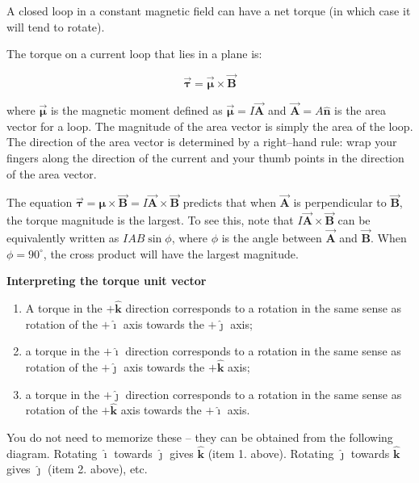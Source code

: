 \documentclass{article}
\newcommand{\ihat}[0]{\hat{\boldsymbol{\imath}}}
\newcommand{\jhat}[0]{\hat{\boldsymbol{\jmath}}}
\newcommand{\khat}[0]{\hat{\boldsymbol{k}}}
\newcommand{\bfvec}[1]{\vec{\mathbf{#1}}}
\begin{document}
A closed loop in a constant magnetic field can have a net torque (in which case it will tend to rotate).

The torque on a current loop that lies in a plane is:

\begin{equation}
\vec{\boldsymbol{\tau}} = \vec{\boldsymbol{\mu}}\times\bfvec{B}
\end{equation}

where $\vec{\boldsymbol{\mu}}$ is the magnetic moment defined as $\vec{\boldsymbol{\mu}}=I\bfvec{A}$ and $\bfvec{A}=A\hat{\mathbf{n}}$ is the area vector for a loop. The magnitude of the area vector is simply the area of the loop. The direction of the area vector is determined by a right--hand rule: wrap your fingers along the direction of the current and your thumb points in the direction of the area vector.

The equation $\vec{\boldsymbol{\tau}} = \boldsymbol{\mu}\times\bfvec{B} = I\bfvec{A}\times\bfvec{B}$ predicts that when $\bfvec{A}$ is perpendicular to $\bfvec{B}$, the torque magnitude is the largest. To see this, note that $I\bfvec{A}\times\bfvec{B}$ can be equivalently written as $IAB\sin\phi$, where $\phi$ is the angle between $\bfvec{A}$ and $\bfvec{B}$. When $\phi = 90^\circ$, the cross product will have the largest magnitude.

\textbf{Interpreting the torque unit vector}

\begin{enumerate}

  \item A torque in the $+\khat$ direction corresponds to a rotation in the same sense as rotation of the $+\ihat$ axis towards the $+\jhat$ axis;

  \item a torque in the $+\ihat$ direction corresponds to a rotation in the same sense as rotation of the $+\jhat$ axis towards the $+\khat$ axis;

  \item a torque in the $+\jhat$ direction corresponds to a rotation in the same sense as rotation of the $+\khat$ axis towards the $+\ihat$ axis.

\end{enumerate}

You do not need to memorize these -- they can be obtained from the following diagram. Rotating $\ihat$ towards $\jhat$ gives $\khat$ (item 1. above). Rotating $\jhat$ towards $\khat$ gives $\jhat$ (item 2. above), etc.
\end{document}
